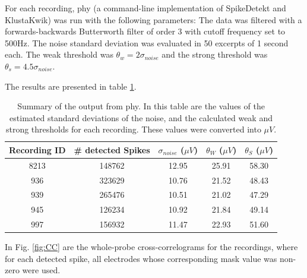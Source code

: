 \documentclass[10pt]{article}
\begin{document}
%
%
%



For each recording, phy (a command-line implementation of SpikeDetekt and KlustaKwik) was run with the following parameters:
The data was filtered with a forwards-backwards Butterworth filter of order 3 with cutoff frequency set to 500Hz. The noise standard deviation was evaluated in 50 excerpts of 1 second each. The weak threshold was $\theta_w = 2 \sigma_{noise}$ and the strong threshold was $\theta_s = 4.5 \sigma_{noise}$.

The results are presented in table \ref{tab:results-from-phy}.

\begin{table}[!h]

\begin{center}
\begin{tabular}{ccccc}
Recording ID & \# detected Spikes & $\sigma_{noise}$ ($\mu V$) & $\theta_W$ ($\mu V$) & $\theta_S$ ($\mu V$) \\ \hline
8213 & 148762 &  12.95 & 25.91 & 58.30 \\ 
936 & 323629 & 10.76 & 21.52 & 48.43 \\ 
939 & 265476 & 10.51 & 21.02 & 47.29 \\ 
945 & 126234 & 10.92 & 21.84 & 49.14 \\ 
997 & 156932 & 11.47 & 22.93 & 51.60 \\ 
\end{tabular}
\end{center}
\caption{Summary of the output from phy. In this table are the values of the estimated standard deviations of the noise, and the calculated weak and strong thresholds for each recording. These values were converted into $\mu V$.}
\label{tab:results-from-phy}
\end{table}


In Fig. \ref{fig:CC} are the whole-probe cross-correlograms for the recordings, where for each detected spike, all electrodes whose corresponding mask value was non-zero were used.
\end{document}
